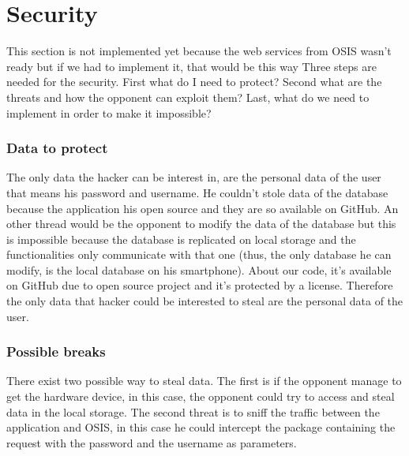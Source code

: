 \documentclass[11pt, a4paper]{report}
\begin{document}
\section{Security}

This section is not implemented yet because the web services from OSIS wasn't ready but if we had to implement it, that would be this way
Three steps are needed for the security. First what do I need to protect? Second what are the threats and how the opponent can exploit them? Last, what do we need to implement in order to make it impossible? 

\subsubsection{Data to protect}
The only data the hacker can be interest in, are the personal data of the user that means his password and username. He couldn't stole data of the database because the application his open source and they are so available on GitHub. An other thread would be the opponent to modify the data of the database but this is impossible because the database is replicated on local storage and the functionalities only communicate with that one (thus, the only database he can modify, is the local database on his smartphone). About our code, it's available on GitHub due to open source project and it's protected by a license. Therefore the only data that hacker could be interested to steal are the personal data of the user.

\subsubsection{Possible breaks}
There exist two possible way to steal data. The first is if the opponent manage to get the hardware device, in this case, the opponent could try to access and steal data in the local storage. The second threat is to sniff the traffic between the application and OSIS, in this case he could intercept the package containing the request with the password and the username as parameters. 
\end{document}
